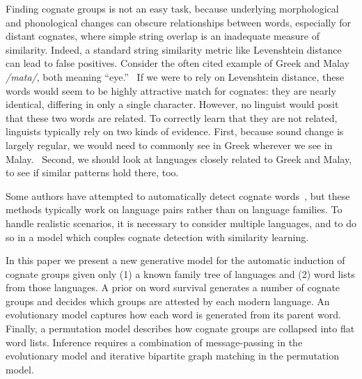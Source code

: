 \documentclass[11pt,a4paper]{article}
\begin{document}
Finding cognate groups is not an easy task, because underlying
morphological and phonological changes can obscure relationships
between words, especially for distant cognates, where simple string
overlap is an inadequate measure of similarity. Indeed, a standard
string similarity metric like Levenshtein distance can lead to false
positives. Consider the often cited example of Greek
\textit{} and Malay \textit{/mata/}, both meaning
``eye.''~\cite{bloomfield38language} If we were to rely on
Levenshtein distance, these words would seem to be highly attractive
match for cognates: they are nearly identical, differing in only a
single character.  However, no linguist would posit that these two
words are related. To correctly learn that they are not related,
linguists typically rely on two kinds of evidence. First, because
sound change is largely regular, we would need to commonly see
\textit{} in Greek wherever we see
\textit{} in
Malay.~\cite{ross50philological} Second,
we should look at languages closely related to Greek and Malay, to
see if similar patterns hold there, too.

Some authors have
attempted to automatically detect cognate
words~\cite{mann01multipath,lowe94reconstruction,oakes00computer,Kondrak01identifyingcognates,mulloni07automatic},
but these methods typically work on language pairs rather than on
language families.  To handle realistic scenarios, it is
necessary to consider multiple languages, and to do so in a model
which couples cognate detection with similarity learning.

In this paper we present a new generative model for the automatic
induction of cognate groups given only (1) a known family tree of
languages and (2) word lists from those languages.  A prior on word
survival generates a number of cognate groups and decides which
groups are attested by each modern language.  An evolutionary model
captures how each word is generated from its parent word.  Finally,
a permutation model describes how cognate groups are collapsed into
flat word lists.  Inference requires a combination of message-passing
in the evolutionary model and iterative bipartite graph matching
in the permutation model.
\end{document}
